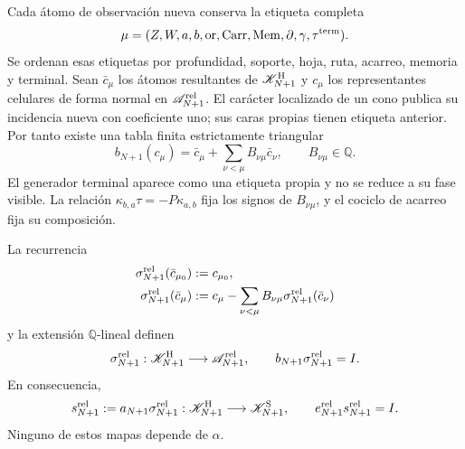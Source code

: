 Cada átomo de observación nueva conserva la etiqueta completa
\[
 \mu=(Z,W,a,b,\operatorname{or},\operatorname{Carr},
       \operatorname{Mem},\partial,\gamma,\tau^{\rm term}).
\]
Se ordenan esas etiquetas por profundidad, soporte, hoja, ruta, acarreo,
memoria y terminal. Sean $\bar c_\mu$ los átomos resultantes de
$\mathscr K^{\rm H}_{N+1}$ y $c_\mu$ los representantes celulares de
forma normal en $\mathscr A_{N+1}^{\rm rel}$. El carácter localizado de un
cono publica su incidencia nueva con coeficiente uno; sus caras propias
tienen etiqueta anterior. Por tanto existe una tabla finita estrictamente
triangular
\begin{equation}\label{eq:pdf2-hodge-tabla-triangular}
 b_{N+1}(c_\mu)
 =\bar c_\mu+\sum_{\nu<\mu}B_{\nu\mu}\bar c_\nu,
 \qquad B_{\nu\mu}\in\mathbb Q.
\end{equation}
El generador terminal aparece como una etiqueta propia y no se reduce a su
fase visible. La relación
$\kappa_{b,a}\tau=-P\kappa_{a,b}$ fija los signos de
$B_{\nu\mu}$, y el cociclo de acarreo fija su composición.

\begin{proposition}
\label{prop:pdf2-hodge-seccion-relativa}
La recurrencia
\begin{equation}\label{eq:pdf2-hodge-sigma-recursiva}
 \begin{aligned}
  \sigma_{N+1}^{\rm rel}(\bar c_{\mu_0})&:=c_{\mu_0},\\
  \sigma_{N+1}^{\rm rel}(\bar c_\mu)&:=
  c_\mu-\sum_{\nu<\mu}B_{\nu\mu}
             \sigma_{N+1}^{\rm rel}(\bar c_\nu)
 \end{aligned}
\end{equation}
y la extensión $\mathbb Q$-lineal definen
\begin{equation}\label{eq:pdf2-hodge-sigma-right-inverse}
 \sigma_{N+1}^{\rm rel}:\mathscr K^{\rm H}_{N+1}\longrightarrow
 \mathscr A_{N+1}^{\rm rel},
 \qquad b_{N+1}\sigma_{N+1}^{\rm rel}=I.
\end{equation}
En consecuencia,
\begin{equation}\label{eq:pdf2-hodge-right-inverse}
 s_{N+1}^{\rm rel}:=a_{N+1}\sigma_{N+1}^{\rm rel}:
 \mathscr K^{\rm H}_{N+1}\longrightarrow\mathscr K^{\rm S}_{N+1},
 \qquad e_{N+1}^{\rm rel}s_{N+1}^{\rm rel}=I.
\end{equation}
Ninguno de estos mapas depende de $\alpha$.
\end{proposition}

